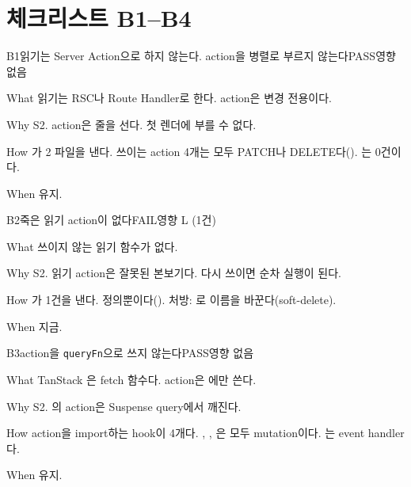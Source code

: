 \section{체크리스트 B1--B4}\label{sec:ac-checklist}

\begin{checkitem}{\ckdone}{B1}{읽기는 Server Action으로 하지 않는다. action을 병렬로 부르지 않는다}{PASS\ckdot{}영향 없음}
  \item[What] 읽기는 RSC나 Route Handler로 한다. action은 변경 전용이다.
  \item[Why] S2. action은 줄을 선다. 첫 렌더에 부를 수 없다.
  \item[How] 가 2 파일을 낸다. 쓰이는 action 4개는 모두 PATCH나 DELETE다(). 는 0건이다.
  \item[When] 유지.
\end{checkitem}

\begin{checkitem}{\ckopen}{B2}{죽은 읽기 action이 없다}{FAIL\ckdot{}영향 L (1건)}
  \item[What] 쓰이지 않는  읽기 함수가 없다.
  \item[Why] S2. 읽기 action은 잘못된 본보기다. 다시 쓰이면 순차 실행이 된다.
  \item[How] 가 1건을 낸다. 정의뿐이다(). 처방: 로 이름을 바꾼다(soft-delete).
  \item[When] 지금.
\end{checkitem}

\begin{checkitem}{\ckdone}{B3}{action을 \texttt{queryFn}으로 쓰지 않는다}{PASS\ckdot{}영향 없음}
  \item[What] TanStack 은 fetch 함수다. action은 에만 쓴다.
  \item[Why] S2. 의 action은 Suspense query에서 깨진다.
  \item[How] action을 import하는 hook이 4개다. , , 은 모두 mutation이다. 는 event handler다.
  \item[When] 유지.
\end{checkitem}

